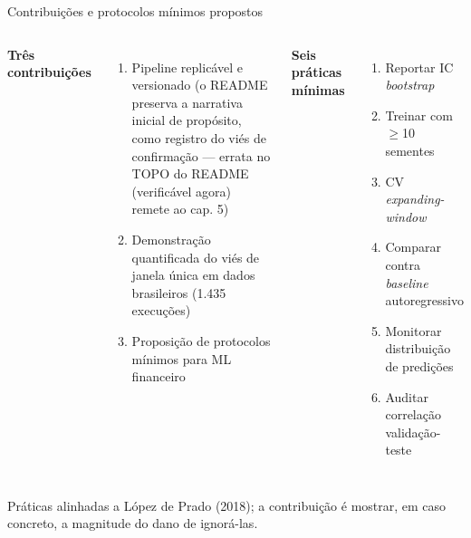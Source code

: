 \documentclass[10pt,aspectratio=169]{beamer}
\begin{document}
\begin{frame}{Contribuições e protocolos mínimos propostos}
  \begin{columns}[T]
    \textbf{Três contribuições}
    \begin{enumerate}
      \item Pipeline replicável e versionado (o README preserva a narrativa inicial \alert{de propósito}, como registro do viés de confirmação --- \alert{errata no TOPO do README} (verificável agora) remete ao cap. 5)
      \item Demonstração quantificada do viés de janela única em dados brasileiros (1.435 execuções)
      \item Proposição de protocolos mínimos para ML financeiro
    \end{enumerate}
    \textbf{Seis práticas mínimas}
    \begin{enumerate}
      \item Reportar IC \textit{bootstrap}
      \item Treinar com $\geq$10 sementes
      \item CV \textit{expanding-window}
      \item Comparar contra \textit{baseline} autoregressivo
      \item Monitorar distribuição de predições
      \item Auditar correlação validação-teste
    \end{enumerate}
  \end{columns}
  \vspace{1ex}
  \footnotesize Práticas alinhadas a López de Prado (2018); a contribuição é mostrar,
  em caso concreto, a magnitude do dano de ignorá-las.
\end{frame}
\end{document}
